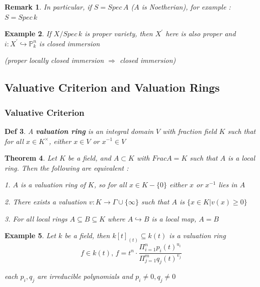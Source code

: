 \documentclass{article}
\newtheorem{theorem}{Theorem}[section]
\newtheorem{definition}[theorem]{Def}
\newtheorem{example}[theorem]{Example}
\newtheorem{remark}[theorem]{Remark}
\begin{document}
\begin{remark}
    In particular, if $S=Spec\,A$ ($A$ is Noetherian), for example : $S=Spec\,k$
\end{remark}

\begin{example}
    If $X/Spec\,k$ is proper variety, then $X^\prime$ here is also proper and $i:X^\prime\hookrightarrow \mathbb P_k^n$ is closed immersion

    (proper locally closed immersion $\Rightarrow$ closed immersion)
\end{example}







\newpage
\subsection{Valuative Criterion and Valuation Rings}

\subsubsection{Valuative Criterion}

\begin{definition}
    A \textbf{valuation ring} is an integral domain $V$ with fraction field $K$ such that for all $x\in K^{\times}$, either $x\in V$ or $x^{-1}\in V$
\end{definition}

\begin{theorem}
Let $K$ be a field, and $A \subset K$ with $Frac A = K$ such that $A$ is a local ring. Then the
following are equivalent :

1. $A$ is a valuation ring of $K$, so for all $x \in K-\{0\}$ either $x$ or $x^{-1}$ lies in $A$

2. There exists a valuation $v : K \to \Gamma \cup \{\infty\}$ such that $A$ is $\{x \in K | v(x) \geq 0\}$

3. For all local rings $A \subseteq B \subseteq K$ where $A \hookrightarrow B$ is a local map, $A = B$
\end{theorem}

\begin{example}
    Let $k$ be a field, then $k[t]_{(t)}\subseteq k(t)$ is a valuation ring
$$f\in k(t),\,f=t^n \cdot \frac{\Pi_{i=1}^n p_i(t)^{u_i}}{\Pi_{j=1}^m q_j(t)^{v_j}}$$

each $p_i,q_j$ are irreducible polynomials and $p_i\ne0,q_j\ne0$
\end{example}
\end{document}
